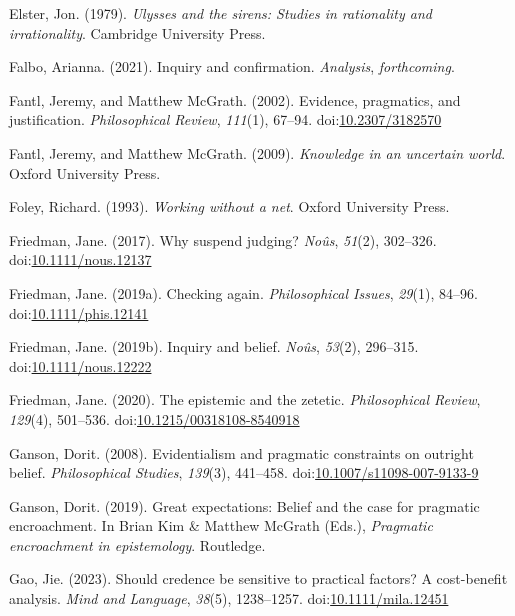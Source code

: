 \documentclass[
  12pt,
  letterpaper,
]{scrbook}
\newlength{\cslhangindent}
\newenvironment{CSLReferences}[2] %
 {\begin{list}{}{%
  \setlength{\itemindent}{0pt}
  \setlength{\leftmargin}{0pt}
  \setlength{\parsep}{0pt}
  \ifodd #1
   \setlength{\leftmargin}{\cslhangindent}
   \setlength{\itemindent}{-1\cslhangindent}
  \fi
  \setlength{\itemsep}{#2\baselineskip}}}
 {\end{list}}
\begin{document}
\begin{CSLReferences}{1}{0}
Elster, Jon. (1979). \emph{Ulysses and the sirens: Studies in
rationality and irrationality}. Cambridge University Press.

Falbo, Arianna. (2021). Inquiry and confirmation. \emph{Analysis},
\emph{forthcoming}.

Fantl, Jeremy, and Matthew McGrath. (2002). Evidence, pragmatics, and
justification. \emph{Philosophical Review}, \emph{111}(1), 67--94.
doi:\href{https://doi.org/10.2307/3182570}{10.2307/3182570}

Fantl, Jeremy, and Matthew McGrath. (2009). \emph{Knowledge in an
uncertain world}. Oxford University Press.

Foley, Richard. (1993). \emph{Working without a net}. Oxford University
Press.

Friedman, Jane. (2017). Why suspend judging? \emph{No{û}s},
\emph{51}(2), 302--326.
doi:\href{https://doi.org/10.1111/nous.12137}{10.1111/nous.12137}

Friedman, Jane. (2019a). Checking again. \emph{Philosophical Issues},
\emph{29}(1), 84--96.
doi:\href{https://doi.org/10.1111/phis.12141}{10.1111/phis.12141}

Friedman, Jane. (2019b). Inquiry and belief. \emph{No{û}s},
\emph{53}(2), 296--315.
doi:\href{https://doi.org/10.1111/nous.12222}{10.1111/nous.12222}

Friedman, Jane. (2020). The epistemic and the zetetic.
\emph{Philosophical Review}, \emph{129}(4), 501--536.
doi:\href{https://doi.org/10.1215/00318108-8540918}{10.1215/00318108-8540918}

Ganson, Dorit. (2008). Evidentialism and pragmatic constraints on
outright belief. \emph{Philosophical Studies}, \emph{139}(3), 441--458.
doi:\href{https://doi.org/10.1007/s11098-007-9133-9}{10.1007/s11098-007-9133-9}

Ganson, Dorit. (2019). Great expectations: Belief and the case for
pragmatic encroachment. In Brian Kim \& Matthew McGrath (Eds.),
\emph{Pragmatic encroachment in epistemology}. Routledge.

Gao, Jie. (2023). Should credence be sensitive to practical factors? A
cost-benefit analysis. \emph{Mind and Language}, \emph{38}(5),
1238--1257.
doi:\href{https://doi.org/10.1111/mila.12451}{10.1111/mila.12451}


\end{CSLReferences}
\end{document}

